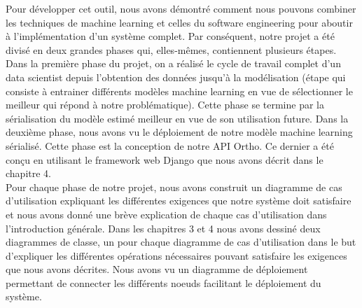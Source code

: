 \documentclass[12pt, french]{report}
\begin{document}
Pour développer cet outil, nous avons démontré comment nous pouvons combiner les techniques de machine learning et celles du software engineering pour aboutir à l'implémentation d'un système complet. Par conséquent, notre projet a été divisé en deux grandes phases qui, elles-mêmes, contiennent plusieurs étapes. Dans la première phase du projet, on a réalisé le cycle de travail complet d'un data scientist depuis l'obtention des données jusqu'à la modélisation (étape qui consiste à entrainer différents modèles machine learning en vue  de sélectionner le meilleur qui répond à notre problématique). Cette phase se termine par la sérialisation du modèle estimé meilleur en vue de son utilisation future. Dans la deuxième phase, nous avons vu le déploiement de notre modèle machine learning sérialisé. Cette phase est la conception de notre API Ortho. Ce dernier a été conçu en utilisant le framework web Django que nous avons décrit dans le chapitre 4. \\

Pour chaque phase de notre projet, nous avons construit un diagramme de cas d'utilisation expliquant les différentes exigences que notre système doit satisfaire et nous avons donné une brève explication de chaque cas d'utilisation dans l'introduction générale. Dans les chapitres 3 et 4 nous avons dessiné deux diagrammes de classe, un pour chaque diagramme de cas d'utilisation dans le but d'expliquer les différentes opérations nécessaires pouvant satisfaire les exigences que nous avons décrites. Nous avons vu un diagramme de déploiement permettant de connecter les différents noeuds facilitant le déploiement du système. 
\end{document}
